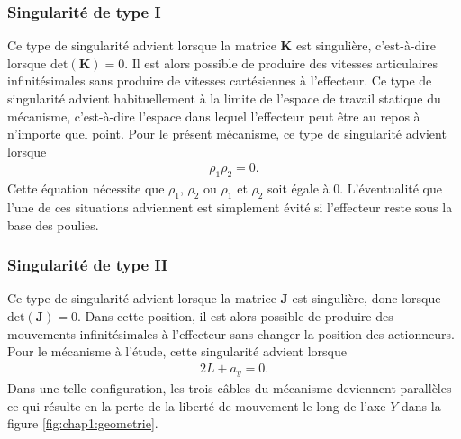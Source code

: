 \subsubsection{Singularité de type I}
Ce type de singularité advient lorsque la matrice $\mathbf{K}$ est singulière, c'est-à-dire lorsque $\text{det}(\mathbf{K})=0$. Il est alors possible de produire des vitesses articulaires infinitésimales sans produire de vitesses cartésiennes à l'effecteur. Ce type de singularité advient habituellement à la limite de l'espace de travail statique du mécanisme, c'est-à-dire l'espace dans lequel l'effecteur peut être au repos à n'importe quel point. Pour le présent mécanisme, ce type de singularité advient lorsque
\begin{align}
\rho_1\rho_2=0.
\end{align}
Cette équation nécessite que $\rho_1$, $\rho_2$ ou $\rho_1$ et $\rho_2$ soit égale à 0. L’éventualité que l'une de ces situations adviennent est simplement évité si l'effecteur reste sous la base des poulies. 
\subsubsection{Singularité de type II}
Ce type de singularité advient lorsque la matrice $\mathbf{J}$ est singulière, donc lorsque $\text{det}(\mathbf{J})=0$. Dans cette position, il est alors possible de produire des mouvements infinitésimales à l'effecteur sans changer la position des actionneurs. Pour le mécanisme à l'étude, cette singularité advient lorsque
\begin{align}
2L+a_y=0.
\end{align}
Dans une telle configuration, les trois câbles du mécanisme deviennent parallèles ce qui résulte en la perte de la liberté de mouvement le long de l'axe $Y$ dans la figure \ref{fig:chap1:geometrie}.  

